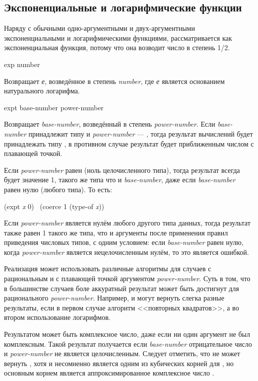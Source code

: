 \subsection{Экспоненциальные и логарифмические функции}

Наряду с обычными одно-аргументными и двух-аргументными экспоненциальными и
логарифмическими функциями,  рассматривается как экспоненциальная
функция, потому что она возводит число в степень 1/2.

\begin{defun}[Функция]
exp number

Возвращает \emph{е}, возведённое в степень \emph{number},
где \emph{е} является основанием натурального логарифма.
\end{defun}

\begin{defun}[Функция]
expt base-number power-number

Возвращает \emph{base-number}, возведённый в степень \emph{power-number}.
Если \emph{base-number} принадлежит типу  и \emph{power-number}
--- , тогда результат вычислений будет принадлежать типу
, в противном случае результат будет приближенным числом с
плавающей точкой.

Если \emph{power-number} равен  (ноль целочисленного типа), тогда
результат всегда будет значение 1, такого же типа что и \emph{base-number}, даже
если \emph{base-number} равен нулю (любого типа). То есть:
\begin{lisp}
(expt \emph{x} 0) \EQ\ (coerce 1 (type-of \emph{x}))
\end{lisp}
Если \emph{power-number} является нулём любого другого типа данных, тогда
результат также равен 1 такого же типа, что и аргументы после применения правил
приведения числовых типов, с одним условием:
если \emph{base-number} равен нулю, когда \emph{power-number} является
нецелочисленным нулём, то это является ошибкой.

Реализация  может использовать различные алгоритмы для случаев с
рациональным и с плавающей точкой аргументом \emph{power-number}. Суть в том,
что в большинстве случаев боле аккуратный результат может быть достигнут для
рационального \emph{power-number}.
Например,  и   могут вернуть слегка разные
результаты, если в первом случае алгоритм <<повторных квадратов>>, а во втором
использование логарифмов.

Результатом  может быть комплексное число, даже если ни один аргумент
не был комплексным. Такой результат получается если \emph{base-number}
отрицательное число и \emph{power-number} не является целочисленным.
Следует отметить, что   не может вернуть , хотя и
 несомненно является одним из кубических корней для , но основным
корнем является аппроксимированное комплексное число .
\end{defun}

